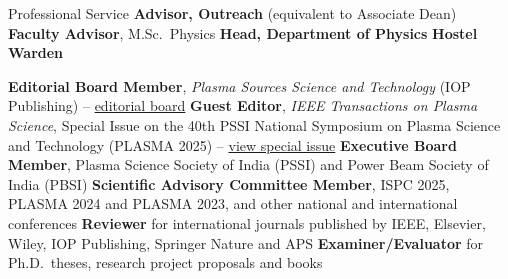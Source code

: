 \begin{rubric}{Professional Service}
\entry*[06/2025 -- present]%
  \textbf{Advisor, Outreach} (equivalent to Associate Dean)
\entry*[2025 batch]%
  \textbf{Faculty Advisor}, M.Sc.\ Physics
\entry*[06/2021 -- 06/2024]%
  \textbf{Head, Department of Physics}
\entry*[08/2019 -- 08/2021]%
  \textbf{Hostel Warden}

\entry*[10/2026 -- present] \textbf{Editorial Board Member}, \emph{Plasma Sources Science and Technology} (IOP Publishing)
  -- \href{https://publishingsupport.iopscience.iop.org/journals/plasma-sources-science-and-technology/editorial-board/}{\textcolor{MarkerColour}{editorial board}}
\entry*[Editorial] \textbf{Guest Editor}, \emph{IEEE Transactions on Plasma Science}, Special Issue on the 40th PSSI National Symposium on Plasma Science and Technology (PLASMA 2025)
  -- \href{https://ieeexplore.ieee.org/document/11349678}{\textcolor{MarkerColour}{view special issue}}
\entry*[Societies] \textbf{Executive Board Member}, Plasma Science Society of India (PSSI) and Power Beam Society of India (PBSI)
\entry*[Conferences] \textbf{Scientific Advisory Committee Member}, ISPC 2025, PLASMA 2024 and PLASMA 2023, and other national and international conferences
\entry*[Reviewing] \textbf{Reviewer} for international journals published by IEEE, Elsevier, Wiley, IOP Publishing, Springer Nature and APS
\entry*[Evaluation] \textbf{Examiner/Evaluator} for Ph.D.\ theses, research project proposals and books
\end{rubric}

